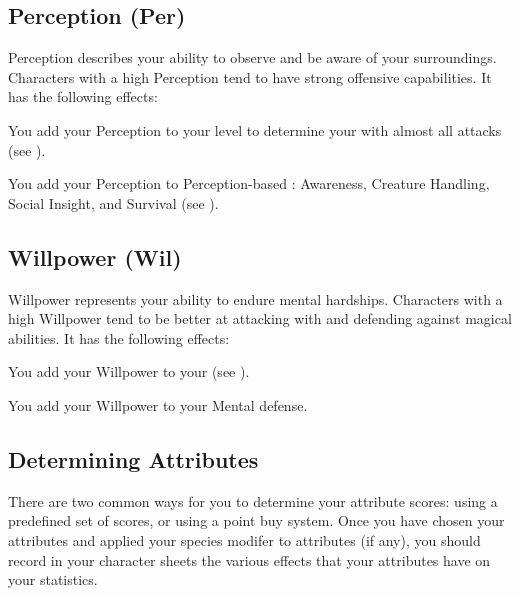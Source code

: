     \subsection{Perception (Per)}\label{Perception}
        {
            Perception describes your ability to observe and be aware of your surroundings.
            Characters with a high Perception tend to have strong offensive capabilities.
            It has the following effects:
            \begin{raggeditemize}
                \item You add your Perception to your level to determine your  with almost all attacks (see ).
                \item You add your Perception to Perception-based : Awareness, Creature Handling, Social Insight, and Survival (see ).
            \end{raggeditemize}
        }

    \subsection{Willpower (Wil)}\label{Willpower}
        {
            Willpower represents your ability to endure mental hardships.
            Characters with a high Willpower tend to be better at attacking with and defending against magical abilities.
            It has the following effects:
            \begin{raggeditemize}
                \item You add your Willpower to your  (see ).
                \item You add your Willpower to your Mental defense.
            \end{raggeditemize}
        }


    \subsection{Determining Attributes}\label{Determining Attributes}
        There are two common ways for you to determine your attribute scores: using a predefined set of scores, or using a point buy system.
        Once you have chosen your attributes and applied your species modifer to attributes (if any), you should record in your character sheets the various effects that your attributes have on your statistics.

